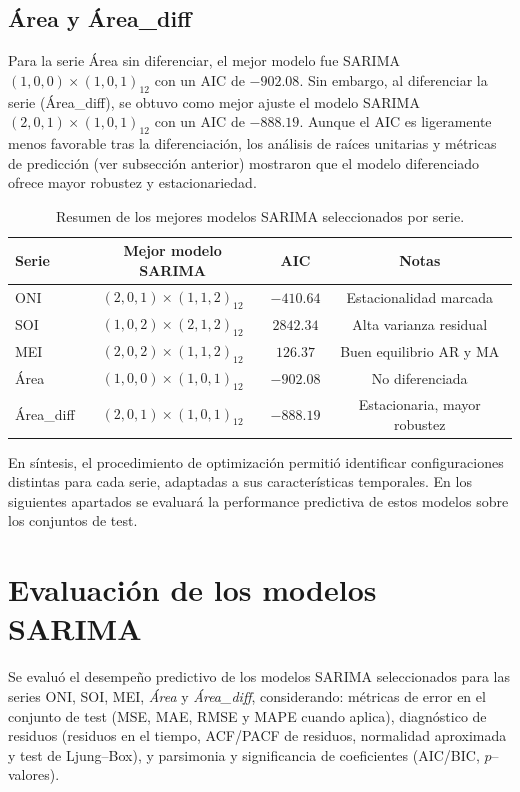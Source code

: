 \subsection{Área y Área\_diff}
Para la serie Área sin diferenciar, el mejor modelo fue SARIMA$(1,0,0)\times(1,0,1)_{12}$ con un AIC de $-902.08$. Sin embargo, al diferenciar la serie (Área\_diff), se obtuvo como mejor ajuste el modelo SARIMA$(2,0,1)\times(1,0,1)_{12}$ con un AIC de $-888.19$. Aunque el AIC es ligeramente menos favorable tras la diferenciación, los análisis de raíces unitarias y métricas de predicción (ver subsección anterior) mostraron que el modelo diferenciado ofrece mayor robustez y estacionariedad.

\begin{table}[H]
    \centering
    \caption{Resumen de los mejores modelos SARIMA seleccionados por serie.}
    \begin{tabular}{lccc}
        \toprule
        \textbf{Serie} & \textbf{Mejor modelo SARIMA} & \textbf{AIC} & \textbf{Notas} \\
        \midrule
        ONI   & $(2,0,1)\times(1,1,2)_{12}$ & $-410.64$ & Estacionalidad marcada \\
        SOI   & $(1,0,2)\times(2,1,2)_{12}$ & $2842.34$ & Alta varianza residual \\
        MEI   & $(2,0,2)\times(1,1,2)_{12}$ & $126.37$  & Buen equilibrio AR y MA \\
        Área  & $(1,0,0)\times(1,0,1)_{12}$ & $-902.08$ & No diferenciada \\
        Área\_diff & $(2,0,1)\times(1,0,1)_{12}$ & $-888.19$ & Estacionaria, mayor robustez \\
        \bottomrule
    \end{tabular}
    \label{tab:sarima_modelos}
\end{table}

En síntesis, el procedimiento de optimización permitió identificar configuraciones distintas para cada serie, adaptadas a sus características temporales. En los siguientes apartados se evaluará la performance predictiva de estos modelos sobre los conjuntos de test.

\section{Evaluación de los modelos SARIMA}

Se evaluó el desempeño predictivo de los modelos SARIMA seleccionados para las series
ONI, SOI, MEI, \emph{Área} y \emph{Área\_diff}, considerando: métricas de error en el
conjunto de test (MSE, MAE, RMSE y MAPE cuando aplica), diagnóstico de residuos
(residuos en el tiempo, ACF/PACF de residuos, normalidad aproximada y test de Ljung--Box),
y parsimonia y significancia de coeficientes (AIC/BIC, $p$--valores).

